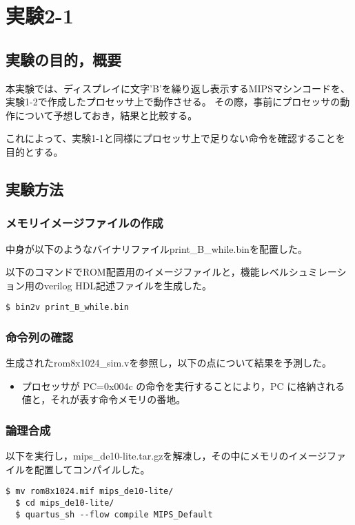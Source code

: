 
\section{実験2-1}
\subsection{実験の目的，概要}
本実験では、ディスプレイに文字'B'を繰り返し表示するMIPSマシンコードを、実験1-2で作成したプロセッサ上で動作させる。
その際，事前にプロセッサの動作について予想しておき，結果と比較する。

これによって、実験1-1と同様にプロセッサ上で足りない命令を確認することを目的とする。

\subsection{実験方法}
\subsubsection{メモリイメージファイルの作成}
中身が以下のようなバイナリファイルprint\_B\_while.binを配置した。


以下のコマンドでROM配置用のイメージファイルと，機能レベルシュミレーション用のverilog HDL記述ファイルを生成した。
\begin{lstlisting}[caption={イメージファイルの作成},label={イメージファイルの作成2-1}]
  $ bin2v print_B_while.bin
\end{lstlisting}

\subsubsection{命令列の確認}
生成されたrom8x1024\_sim.vを参照し，以下の点について結果を予測した。
\begin{itemize}
  \item プロセッサが PC=0x004c の命令を実行することにより，PC に格納される値と，それが表す命令メモリの番地。
\end{itemize}

\subsubsection{論理合成}
以下を実行し，mips\_de10-lite.tar.gzを解凍し，その中にメモリのイメージファイルを配置してコンパイルした。
\begin{lstlisting}[caption={論理合成操作},label={論理合成操作2-1}]
  $ mv rom8x1024.mif mips_de10-lite/
  $ cd mips_de10-lite/
  $ quartus_sh --flow compile MIPS_Default
\end{lstlisting}

